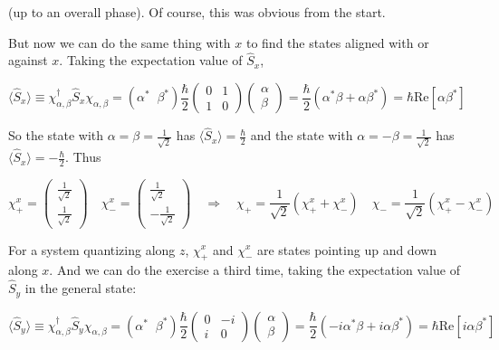 (up to an overall phase). Of course, this was obvious from the start. 


But now we can do the same thing with $x$ to find the states aligned with or
against $x$. Taking the expectation value of $\hat{S}_x$, 

\[
  \langle \hat{S}_x \rangle \equiv \chi_{\alpha, \beta}^\dagger \hat{S}_x
  \chi_{\alpha, \beta} = (\alpha^* \; \; \beta^* ) \frac{\hbar}{2}\begin{pmatrix}
    0 & 1 \\ 1 & 0 
  \end{pmatrix} \begin{pmatrix}
    \alpha \\ \beta
  \end{pmatrix} = \frac{\hbar}{2} (\alpha^* \beta + \alpha \beta^* ) = \hbar
  \text{Re}[\alpha \beta^*] 
\] \vspace{3px}

So the state with $\alpha = \beta = \frac{1}{\sqrt{2}}$ has $\langle \hat{S}_x
\rangle = \frac{\hbar}{2}$ and the state with $\alpha = -\beta
= \frac{1}{\sqrt{2}}$ has $\langle \hat{S}_x\rangle = -\frac{\hbar}{2}$. Thus

\[
\chi_+^x = \begin{pmatrix}
  \frac{1}{\sqrt{2}} \\ \frac{1}{\sqrt{2}} \end{pmatrix} \quad \chi_-^x = \begin{pmatrix}
    \frac{1}{\sqrt{2}} \\ - \frac{1}{\sqrt{2}}
  \end{pmatrix} \quad \Rightarrow \quad \chi_+ = \frac{1}{\sqrt{2}} (\chi_+^x
  + \chi_-^x) \quad \chi_- = \frac{1}{\sqrt{2}} (\chi_+^x - \chi_-^x)
\] \vspace{3px}

For a system quantizing along $z$, $\chi_+^x$ and $\chi_-^x$ are states
pointing up and down along $x$. And we can do the exercise a third time, taking
the expectation value of $\hat{S}_y$ in the general state: 

\[
  \langle \hat{S}_y \rangle \equiv \chi_{\alpha, \beta}^\dagger \hat{S}_y
  \chi_{\alpha, \beta} = (\alpha^* \;\; \beta^*) \frac{\hbar}{2}\begin{pmatrix}
    0 & -i \\ i & 0 
  \end{pmatrix} \begin{pmatrix}
    \alpha \\ \beta
  \end{pmatrix} = \frac{\hbar}{2} (-i\alpha^*\beta + i\alpha \beta^*) = \hbar
  \text{Re}[i\alpha \beta^*]
\] \vspace{3px}

